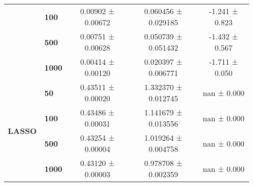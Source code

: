 \begin{tabular}{llccc}
      & \textbf{100 } &  0.00902 ± 0.00672 &  0.060456 ± 0.029185 &  -1.241 ± 0.823 \\
      & \textbf{500 } &  0.00751 ± 0.00628 &  0.050739 ± 0.051432 &  -1.432 ± 0.567 \\
      & \textbf{1000} &  0.00414 ± 0.00120 &  0.020397 ± 0.006771 &  -1.711 ± 0.050 \\
\cline{1-5}
\multirow{4}{*}{\textbf{LASSO}} & \textbf{50  } &  0.43511 ± 0.00020 &  1.332370 ± 0.012745 &     nan ± 0.000 \\
      & \textbf{100 } &  0.43486 ± 0.00031 &  1.141679 ± 0.013556 &     nan ± 0.000 \\
      & \textbf{500 } &  0.43254 ± 0.00004 &  1.019264 ± 0.004758 &     nan ± 0.000 \\
      & \textbf{1000} &  0.43120 ± 0.00003 &  0.978708 ± 0.002359 &     nan ± 0.000 \\
\bottomrule
\end{tabular}
